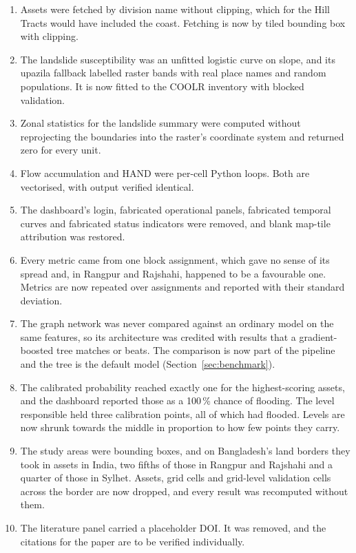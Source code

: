 \documentclass[10pt,a4paper,twocolumn]{article}
\begin{document}
\begin{enumerate}[leftmargin=*, itemsep=0.35em]
\item Assets were fetched by division name without clipping, which for the Hill Tracts would have included the coast. Fetching is now by tiled bounding box with clipping.
\item The landslide susceptibility was an unfitted logistic curve on slope, and its upazila fallback labelled raster bands with real place names and random populations. It is now fitted to the COOLR inventory with blocked validation.
\item Zonal statistics for the landslide summary were computed without reprojecting the boundaries into the raster's coordinate system and returned zero for every unit.
\item Flow accumulation and HAND were per-cell Python loops. Both are vectorised, with output verified identical.
\item The dashboard's login, fabricated operational panels, fabricated temporal curves and fabricated status indicators were removed, and blank map-tile attribution was restored.
\item Every metric came from one block assignment, which gave no sense of its spread and, in Rangpur and Rajshahi, happened to be a favourable one. Metrics are now repeated over \RRBenchSeeds{} assignments and reported with their standard deviation.
\item The graph network was never compared against an ordinary model on the same features, so its architecture was credited with results that a gradient-boosted tree matches or beats. The comparison is now part of the pipeline and the tree is the default model (Section~\ref{sec:benchmark}).
\item The calibrated probability reached exactly one for the highest-scoring assets, and the dashboard reported those as a 100\,\% chance of flooding. The level responsible held three calibration points, all of which had flooded. Levels are now shrunk towards the middle in proportion to how few points they carry.
\item The study areas were bounding boxes, and on Bangladesh's land borders they took in assets in India, two fifths of those in Rangpur and Rajshahi and a quarter of those in Sylhet. Assets, grid cells and grid-level validation cells across the border are now dropped, and every result was recomputed without them.
\item The literature panel carried a placeholder DOI. It was removed, and the citations for the paper are to be verified individually.
\end{enumerate}
\end{document}
